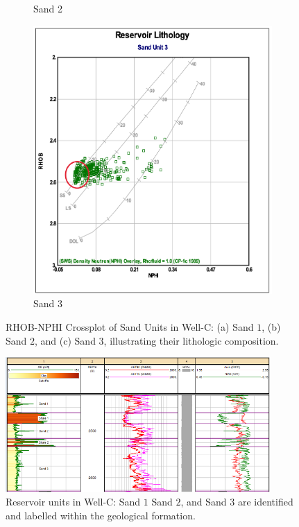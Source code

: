 \documentclass{gji}
\begin{document}
\begin{figure}
\begin{subfigure}{0.4\textwidth}
    \caption{Sand 2}
    \label{fig:sand2}
\end{subfigure}
\hfill
\begin{subfigure}{0.4\textwidth}
    \includegraphics[width=\textwidth]{SS3}
    \caption{Sand 3}
    \label{fig:sand3}
\end{subfigure}
        
\caption{RHOB-NPHI Crossplot of Sand Units in Well-C: (a) Sand $1$, (b) Sand $2$, and (c) Sand $3$, illustrating their lithologic composition.}\label{fig:sand123}
\end{figure}

%
\begin{figure}%
    \centering    \includegraphics[width=0.9\textwidth]{perto2}%
    \caption{Reservoir units in Well-C: Sand $1$ Sand $2$, and  Sand $3$ are identified and labelled within the geological formation.}
    \label{fig:perto2}
\end{figure}
\end{document}
